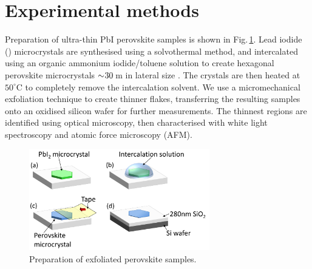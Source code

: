 \section{Experimental methods}
Preparation of ultra-thin PbI perovskite samples is shown in Fig.\,\ref{5Fig1}. Lead iodide () microcrystals are synthesised using a solvothermal method, and intercalated using an organic ammonium iodide/toluene solution to create hexagonal perovskite microcrystals $\sim\negmedspace30\,$\textmu m in lateral size \cite{Saikumar2012}. The crystals are then heated at $50^{\circ}$C to completely remove the intercalation solvent. We use a micromechanical exfoliation technique to create thinner flakes, transferring the resulting samples onto an oxidised silicon wafer for further measurements. The thinnest regions are identified using optical microscopy, then characterised with white light spectroscopy and atomic force microscopy (AFM).
\begin{figure}[h!] 
\centering    
\includegraphics[width=0.7\textwidth]{Fig1}
\caption{Preparation of exfoliated perovskite samples.}
\label{5Fig1}
\end{figure}


